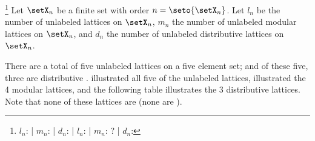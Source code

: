 \begin{proposition}
\footnote{
  $l_n$:  | %
  $m_n$:  | %
  $d_n$:  | %
  $l_n$:  | %
  $m_n$: ? | %
  $d_n$:  %
  }
\label{prop:lat_num_ldm}
Let $\setX_n$ be a finite set with order $n=\seto{\setX_n}$.
Let $l_n$ be the number of unlabeled lattices on $\setX_n$,
    $m_n$ the number of unlabeled modular lattices on $\setX_n$,
and $d_n$ the number of unlabeled distributive lattices on $\setX_n$.
\end{proposition}



\begin{example}
\label{ex:lat_set5_distrib}
There are a total of five unlabeled lattices on a five element set;
and of these five, three are distributive .
 illustrated all five of the unlabeled lattices,
 illustrated the 4 modular lattices,
and the following table illustrates the 3 distributive lattices.
Note that none of these lattices are  
(none are ).
\end{example}


